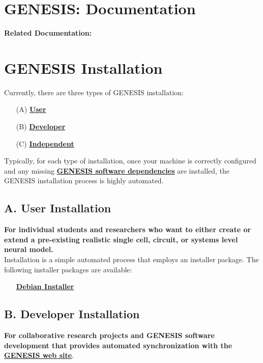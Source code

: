 \documentclass[12pt]{article}
\begin{document}
\section*{GENESIS: Documentation}

{\bf Related Documentation:}

\section*{GENESIS  Installation}

Currently, there are three types of GENESIS installation:
\begin{itemize}
   \item[(A)]\href{../installation-debian/installation-debian.tex}{\bf User}
   \item[(B)]\href{../installation-developer/installation-developer.tex}{\bf Developer}
   \item[(C)]\href{../installation-independent/installation-independent.tex}{\bf Independent}
\end{itemize}
Typically, for each type of installation, once your machine is correctly configured and any missing \href{../genesis-dependencies/genesis-dependencies.tex}{\bf GENESIS software dependencies} are installed, the GENESIS installation process is highly automated.

\subsection*{A. User Installation}

{\bf For individual students and researchers who want to either create or extend a pre-existing realistic single cell, circuit, or systems level neural model.} \\
Installation is a simple automated process that employs an installer package. The following installer packages are available:
\begin{itemize}
   \item[] \href{../installation-debian/installation-debian.tex}{\bf Debian Installer}
\end{itemize}
   
\subsection*{B. Developer Installation}

{\bf For collaborative research projects and GENESIS software development that provides automated synchronization with the \href{http://www.genesis-sim.org/}{\bf GENESIS web site}}.
\end{document}
